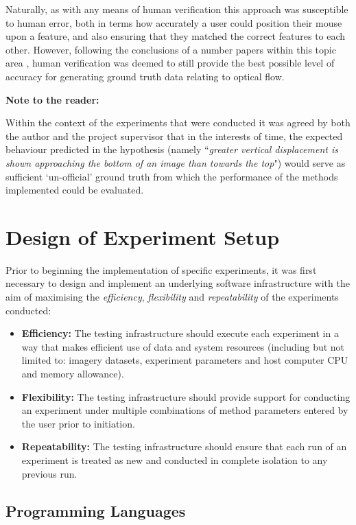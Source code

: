 Naturally, as with any means of human verification this approach was susceptible to human error, both in terms how accurately a user could position their mouse upon a feature, and also ensuring that they matched the correct features to each other. However, following the conclusions of a number papers within this topic area \cite{kondermann} \cite{haltakov} \cite{}, human verification was deemed to still provide the best possible level of accuracy for generating ground truth data relating to optical flow.

\textbf{Note to the reader:}

Within the context of the experiments that were conducted it was agreed by both the author and the project supervisor that in the interests of time, the expected behaviour predicted in the hypothesis (namely  ``\textit{greater vertical displacement is shown approaching the bottom of an image than towards the top}") would serve as sufficient `un-official' ground truth from which the performance of the methods implemented could be evaluated.

\section{Design of Experiment Setup}

Prior to beginning the implementation of specific experiments, it was first necessary to design and implement an underlying software infrastructure with the aim of maximising the \textit{efficiency}, \textit{flexibility} and \textit{repeatability} of the experiments conducted:

\begin{itemize}
	\item \textbf{Efficiency:} The testing infrastructure should execute each experiment in a way that makes efficient use of data and system resources (including but not limited to: imagery datasets, experiment parameters and host computer CPU and memory allowance).
	\item \textbf{Flexibility:} The testing infrastructure should provide support for conducting an experiment under multiple combinations of method parameters entered by the user prior to initiation.  
	\item \textbf{Repeatability:} The testing infrastructure should ensure that each run of an experiment is treated as new and conducted in complete isolation to any previous run. 
\end{itemize}

\subsection{Programming Languages}
\label{lang}


